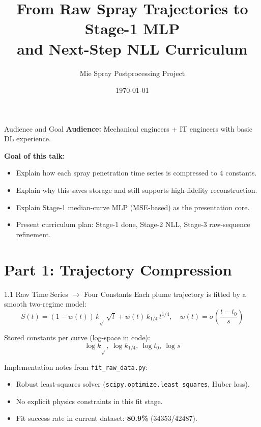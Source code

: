 \documentclass[UTF8,aspectratio=169]{ctexbeamer}
\title{From Raw Spray Trajectories to Stage-1 MLP\\and Next-Step NLL Curriculum}
\author{Mie Spray Postprocessing Project}
\date{\today}
\begin{document}
\begin{frame}
  \titlepage
\end{frame}

\begin{frame}{Audience and Goal}
\textbf{Audience:} Mechanical engineers + IT engineers with basic DL experience.

\vspace{0.5em}
\textbf{Goal of this talk:}
\begin{itemize}
  \item Explain how each spray penetration time series is compressed to 4 constants.
  \item Explain why this saves storage and still supports high-fidelity reconstruction.
  \item Explain Stage-1 median-curve MLP (MSE-based) as the presentation core.
  \item Present curriculum plan: Stage-1 done, Stage-2 NLL, Stage-3 raw-sequence refinement.
\end{itemize}
\end{frame}

\section{Part 1: Trajectory Compression}

\begin{frame}{1.1 Raw Time Series $\rightarrow$ Four Constants}
Each plume trajectory is fitted by a smooth two-regime model:
\[
S(t) = (1-w(t))\,k_{\sqrt{}}\,\sqrt{t} + w(t)\,k_{1/4}\,t^{1/4},
\quad
w(t)=\sigma\!\left(\frac{t-t_0}{s}\right)
\]

\vspace{0.3em}
Stored constants per curve (log-space in code):
\[
\log k_{\sqrt{}},\ \log k_{1/4},\ \log t_0,\ \log s
\]

\vspace{0.3em}
Implementation notes from \texttt{fit\_raw\_data.py}:
\begin{itemize}
  \item Robust least-squares solver (\texttt{scipy.optimize.least\_squares}, Huber loss).
  \item No explicit physics constraints in this fit stage.
  \item Fit success rate in current dataset: \textbf{80.9\%} (\num{34353}/\num{42487}).
\end{itemize}
\end{frame}
\end{document}
